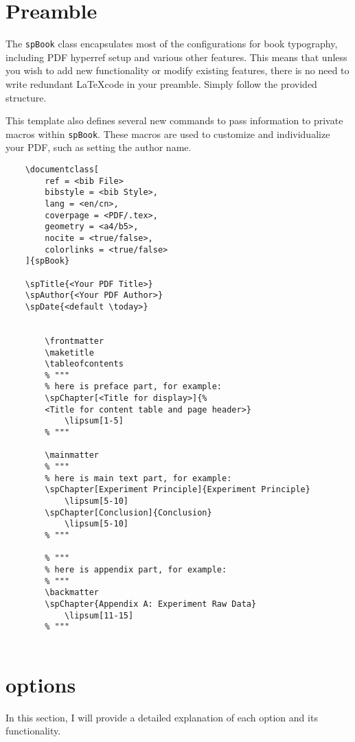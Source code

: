 
\section{Preamble}
The \texttt{spBook} class encapsulates most of the configurations for book typography, including PDF hyperref setup and various other features. This means that unless you wish to add new functionality or modify existing features, there is no need to write redundant \LaTeX code in your preamble. Simply follow the provided structure.

This template also defines several new commands to pass information to private macros within \texttt{spBook}. These macros are used to customize and individualize your PDF, such as setting the author name.

\begin{Verbatim}
    \documentclass[
        ref = <bib File>
        bibstyle = <bib Style>,
        lang = <en/cn>,
        coverpage = <PDF/.tex>,
        geometry = <a4/b5>,
        nocite = <true/false>,
        colorlinks = <true/false>
    ]{spBook}

    \spTitle{<Your PDF Title>}
    \spAuthor{<Your PDF Author>}
    \spDate{<default \today>}

    
        \frontmatter
        \maketitle
        \tableofcontents
        % """
        % here is preface part, for example:
        \spChapter[<Title for display>]{%
        <Title for content table and page header>}
            \lipsum[1-5]
        % """

        \mainmatter
        % """
        % here is main text part, for example:
        \spChapter[Experiment Principle]{Experiment Principle}
            \lipsum[5-10]
        \spChapter[Conclusion]{Conclusion}
            \lipsum[5-10]
        % """

        % """
        % here is appendix part, for example:
        % """
        \backmatter
        \spChapter{Appendix A: Experiment Raw Data}
            \lipsum[11-15]
        % """
    
\end{Verbatim}

\section{options}
    In this section, I will provide a detailed explanation of each option and its functionality.

